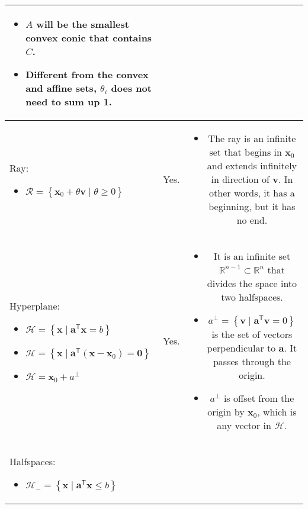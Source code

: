 \documentclass{article}
\newcommand{\trans}{\mathsf{T}}
\begin{document}
\begin{table}[ht!]
\begin{tabularx}{\textwidth}{|A|B|C|}
\begin{itemize}[leftmargin=*]
    \item $A$ will be the smallest convex conic that contains $C$.
    \item Different from the convex and affine sets, \(\theta_i\) does not need to sum up 1.
\end{itemize}\\
\hline
Ray:
\begin{itemize}[leftmargin=*]
    \item \(\mathcal{R} = \left\{ \mathbf{x}_0 + \theta \mathbf{v} \mid \theta \geq 0 \right\}\)
\end{itemize} & Yes. & \vspace{-3.5ex} \begin{itemize}[leftmargin=*]
    \item The ray is an infinite set that begins in \(\mathbf{x}_0\) and extends infinitely in direction of \(\mathbf{v}\). In other words, it has a beginning, but it has no end.
\end{itemize} \\
\hline
Hyperplane:
\begin{itemize}[leftmargin=*]
    \item \( \mathcal{H} = \left\{ \mathbf{x} \mid \mathbf{a}^\trans \mathbf{x} = b \right\}\)
    \item \(\mathcal{H} = \left\{ \mathbf{x} \mid \mathbf{a}^\trans (\mathbf{x} - \mathbf{x}_{0}) = \mathbf{0} \right\}\)
    \item \(\mathcal{H} = \mathbf{x}_0 + a^{\perp} \)
\end{itemize} & Yes. & \vspace{-3.5ex}
\begin{itemize}[leftmargin=*]
    \item It is an infinite set \(\mathbb{R}^{n-1} \subset \mathbb{R}^{n}\) that divides the space into two halfspaces.
    \item \(a^{\perp} = \left\{ \mathbf{v} \mid \mathbf{a}^\trans \mathbf{v} = 0 \right\}\) is the set of vectors perpendicular to \(\mathbf{a}\). It passes through the origin.
    \item \(a^{\perp}\) is offset from the origin by \(\mathbf{x}_0\), which is any vector in \(\mathcal{H}\).
\end{itemize} \\
\hline
Halfspaces:
\begin{itemize}[leftmargin=*]
    \item \(\mathcal{H}_{-} = \left\{ \mathbf{x} \mid \mathbf{a}^\trans \mathbf{x} \leq b \right\}\)

\end{itemize}
\end{tabularx}
\end{table}
\end{document}
